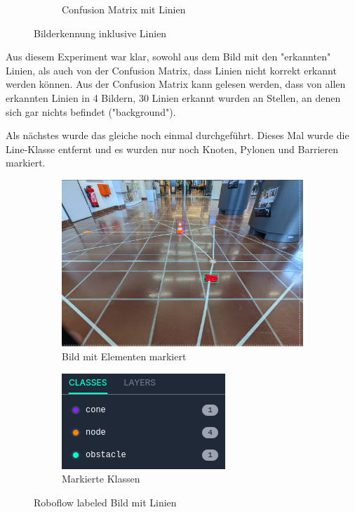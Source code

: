 \begin{figure}[H]
\begin{subfigure}{0.69\textwidth}
\caption{Confusion Matrix mit Linien}
\label{fig:conf-matrix-lines}
\end{subfigure}

\caption{Bilderkennung inklusive Linien}
\label{fig:recognition-with-lines}
\end{figure}

Aus diesem Experiment war klar, sowohl aus dem Bild mit den "erkannten" Linien, als auch von der Confusion Matrix, dass Linien nicht korrekt erkannt werden können.
Aus der Confusion Matrix kann gelesen werden, dass von allen erkannten Linien in 4 Bildern, 30 Linien erkannt wurden an Stellen, an denen sich gar nichts befindet ("background").

Als nächstes wurde das gleiche noch einmal durchgeführt. Dieses Mal wurde die Line-Klasse entfernt und es wurden nur noch Knoten, Pylonen und Barrieren markiert.

\begin{figure}[H]
\begin{subfigure}{0.55\textwidth}
\includegraphics[width=0.95\linewidth]{assets/informatik-prototyp/yolo/labeled-image.png} 
\caption{Bild mit Elementen markiert}
\label{fig:labeled-image}
\end{subfigure}
\begin{subfigure}{0.4\textwidth}
\includegraphics[width=0.95\linewidth]{assets/informatik-prototyp/yolo/labeled-classes.png} 
\caption{Markierte Klassen}
\label{fig:line-classes}
\end{subfigure}

\caption{Roboflow labeled Bild mit Linien}
\label{fig:labeled-with-lines}
\end{figure}

